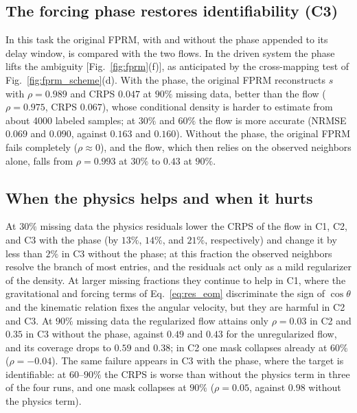 \subsection{The forcing phase restores identifiability (C3)}\label{sec:res_c3}

In this task the original FPRM, with and without the phase appended to its delay window, is compared with the two flows. In the driven system the phase lifts the ambiguity [Fig.~\ref{fig:fprm}(f)], as anticipated by the cross-mapping test of Fig.~\ref{fig:fprm_scheme}(d). With the phase, the original FPRM reconstructs $s$ with $\rho=0.989$ and CRPS $0.047$ at $90\%$ missing data, better than the flow ($\rho=0.975$, CRPS $0.067$), whose conditional density is harder to estimate from about 4000 labeled samples; at $30\%$ and $60\%$ the flow is more accurate (NRMSE $0.069$ and $0.090$, against $0.163$ and $0.160$). Without the phase, the original FPRM fails completely ($\rho\approx0$), and the flow, which then relies on the observed neighbors alone, falls from $\rho=0.993$ at $30\%$ to $0.43$ at $90\%$.

\subsection{When the physics helps and when it hurts}\label{sec:res_physics}

At $30\%$ missing data the physics residuals lower the CRPS of the flow in C1, C2, and C3 with the phase (by $13\%$, $14\%$, and $21\%$, respectively) and change it by less than $2\%$ in C3 without the phase; at this fraction the observed neighbors resolve the branch of most entries, and the residuals act only as a mild regularizer of the density. At larger missing fractions they continue to help in C1, where the gravitational and forcing terms of Eq.~\eqref{eq:res_eom} discriminate the sign of $\cos\theta$ and the kinematic relation fixes the angular velocity, but they are harmful in C2 and C3. At $90\%$ missing data the regularized flow attains only $\rho=0.03$ in C2 and $0.35$ in C3 without the phase, against $0.49$ and $0.43$ for the unregularized flow, and its coverage drops to $0.59$ and $0.38$; in C2 one mask collapses already at $60\%$ ($\rho=-0.04$). The same failure appears in C3 with the phase, where the target is identifiable: at $60$--$90\%$ the CRPS is worse than without the physics term in three of the four runs, and one mask collapses at $90\%$ ($\rho=0.05$, against $0.98$ without the physics term).


